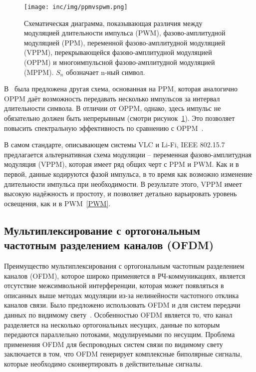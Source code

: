 \begin{figure}[!ht]
    \centering
    \texttt{[image: inc/img/ppmvspwm.png]}
    \caption{Схематическая диаграмма, показывающая различия между модуляцией длительности импульса (PWM), фазово-амплитудной модуляцией (PPM), переменной фазово-амплитудной модуляцией (VPPM), перекрывающейся фазово-амплитудной модуляцией (OPPM) и многоимпульсной фазово-амплитудной модуляцией (MPPM). $S_n$ обозначает n-ный символ.~\cite{Pathak2015}}
    \label{fig:ppmvspwm}
\end{figure}

В~\cite{Sugiyama1989} была предложена другая схема, основанная на PPM, которая аналогично OPPM даёт возможность передавать несколько импульсов за интервал длительности символа. В отличии от OPPM, однако, здесь импульс не обязательно должен быть непрерывным (смотри рисунок~\ref{fig:ppmvspwm}). Это позволяет повысить спектральную эффективность по сравнению с OPPM~\cite{Shiu1999}.


В самом стандарте, описывающем системы VLC и Li-Fi, IEEE 802.15.7~\cite{IEEE2018} предлагается альтернативная схема модуляции \--- переменная фазово-амплитудная модуляция (VPPM), которая имеет ряд общих черт с PPM и PWM. Как и в первой, данные кодируются фазой импульса, в то время как возможно изменение длительности импульса при необходимости. В результате этого, VPPM имеет высокую надёжность и простоту, и позволяет детально варьировать уровень освещения, как и в PWM~\ref{PWM}.

\subsection{Мультиплексирование с орто­гональным частотным разделением каналов (OFDM)}

Преимущество мультиплексирования с орто­гональным частотным разделением каналов (OFDM), которое широко применяется в РЧ-коммуникациях, является отсутствие межсимвольной интерференции, которая может появляться в описанных выше методах модуляции из-за нелинейности частотного отклика каналов связи. Было предложено использовать OFDM и для систем передачи данных по видимому свету~\cite{Afgani2006}. Особенностью OFDM является то, что канал разделяется на несколько орто­гональных несущих, данные по которым передаются параллельно потоками,  модулируемыми по несущим. Проблема применения OFDM для беспроводных систем связи по видимому свету заключается в том, что OFDM генерирует комплексные биполярные сигналы, которые необходимо сконвертировать в действительные сигналы.

